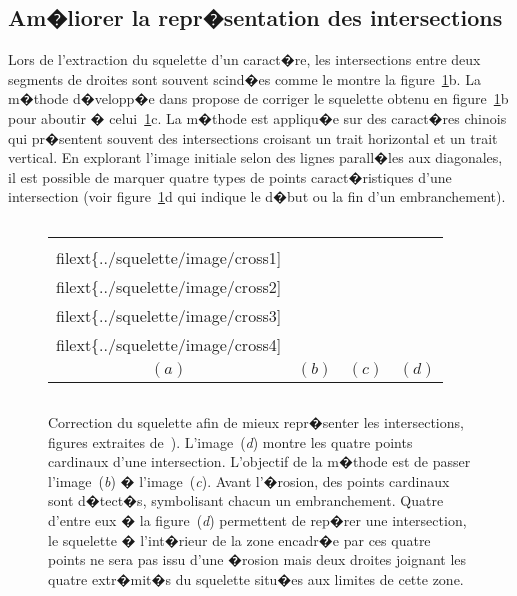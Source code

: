 \subsection{Am�liorer la repr�sentation des intersections}


Lors de l'extraction du squelette d'un caract�re, les intersections entre deux segments de droites sont souvent scind�es comme le montre la figure~\ref{squelette_zhong_intersection}b. La m�thode d�velopp�e dans  propose de corriger le squelette obtenu en figure~\ref{squelette_zhong_intersection}b pour aboutir � celui~\ref{squelette_zhong_intersection}c.  La m�thode est appliqu�e sur des caract�res chinois qui pr�sentent souvent des intersections croisant un trait horizontal et un trait vertical. En explorant l'image initiale selon des lignes parall�les aux diagonales, il est possible de marquer quatre types de points caract�ristiques d'une intersection (voir figure~\ref{squelette_zhong_intersection}d qui indique le d�but ou la fin d'un embranchement). 

            \begin{figure}[ht]
        $$\begin{tabular}{|c|c|c|c|} \hline
        \texttt{[image: \\filext\{../squelette/image/cross1]}} & 
        \texttt{[image: \\filext\{../squelette/image/cross2]}} & 
        \texttt{[image: \\filext\{../squelette/image/cross3]}} &
        \texttt{[image: \\filext\{../squelette/image/cross4]}} \\
        $(a)$ & $(b)$ & $(c)$ & $(d)$ 
        \\ \hline \end{tabular}$$
        \caption{    Correction du squelette afin de mieux repr�senter les intersections, figures extraites 
                            de~). L'image~(\textit{d}) montre les quatre points cardinaux 
                            d'une intersection. L'objectif de la m�thode est de passer l'image~(\textit{b})
                            � l'image~(\textit{c}). Avant l'�rosion, des points cardinaux sont d�tect�s, symbolisant
                            chacun un embranchement. Quatre d'entre eux � la figure~(\textit{d}) 
                            permettent de rep�rer une intersection, le squelette � l'int�rieur de la zone encadr�e par 
                            ces quatre points ne sera pas issu d'une �rosion mais deux droites joignant les quatre extr�mit�s
                            du squelette situ�es aux limites de cette zone. }
        \label{squelette_zhong_intersection}
            \end{figure}


